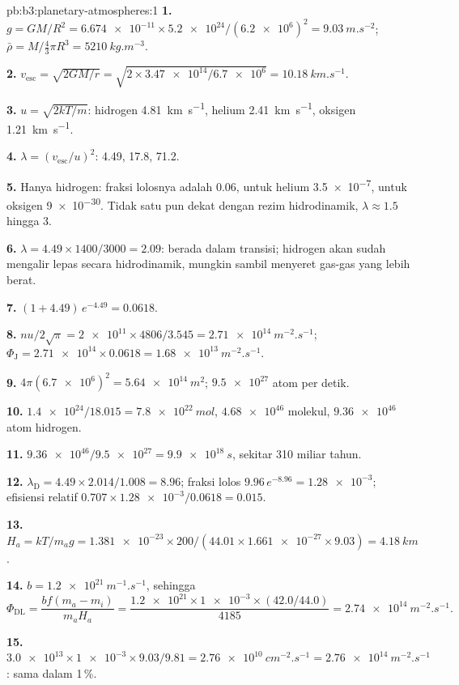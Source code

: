\begin{solution}{pb:b3:planetary-atmospheres:1}
\textbf{1.} $g = GM/R^2 = \num{6.674e-11}\times\num{5.2e24}/(\num{6.2e6})^2 =
\qty{9.03}{m.s^{-2}}$; $\bar\rho = M/\tfrac43\pi R^3 = \qty{5210}{kg.m^{-3}}$.

\textbf{2.} $v_\mathrm{esc} = \sqrt{2GM/r} = \sqrt{2\times\num{3.47e14}/\num{6.7e6}}
= \qty{10.18}{km.s^{-1}}$.

\textbf{3.} $u = \sqrt{2kT/m}$: hidrogen \qty{4.81}{km.s^{-1}}, helium
\qty{2.41}{km.s^{-1}}, oksigen \qty{1.21}{km.s^{-1}}.

\textbf{4.} $\lambda = (v_\mathrm{esc}/u)^2$: 4.49, 17.8, 71.2.

\textbf{5.} Hanya hidrogen: fraksi lolosnya adalah 0.06, untuk helium
\num{3.5e-7}, untuk oksigen \num{9e-30}. Tidak satu pun dekat dengan rezim
hidrodinamik, $\lambda \approx 1.5$ hingga 3.

\textbf{6.} $\lambda = 4.49\times1400/3000 = 2.09$: berada dalam transisi;
hidrogen akan sudah mengalir lepas secara hidrodinamik, mungkin sambil menyeret
gas-gas yang lebih berat.

\textbf{7.} $(1 + 4.49)\,e^{-4.49} = 0.0618$.

\textbf{8.} $n u/2\sqrt\pi = \num{2e11}\times4806/3.545 = \qty{2.71e14}{m^{-2}.s^{-1}}$;
$\Phi_\mathrm J = \num{2.71e14}\times0.0618 = \qty{1.68e13}{m^{-2}.s^{-1}}$.

\textbf{9.} $4\pi(\num{6.7e6})^2 = \qty{5.64e14}{m^2}$; $\num{9.5e27}$ atom per
detik.

\textbf{10.} $\num{1.4e24}/18.015 = \qty{7.8e22}{mol}$, $\num{4.68e46}$ molekul,
$\num{9.36e46}$ atom hidrogen.

\textbf{11.} $\num{9.36e46}/\num{9.5e27} = \qty{9.9e18}{s}$, sekitar 310 miliar
tahun.

\textbf{12.} $\lambda_\mathrm D = 4.49\times2.014/1.008 = 8.96$; fraksi lolos
$9.96\,e^{-8.96} = \num{1.28e-3}$; efisiensi relatif $0.707\times
\num{1.28e-3}/0.0618 = 0.015$.

\textbf{13.} $H_a = kT/m_a g = \num{1.381e-23}\times200/(44.01\times\num{1.661e-27}
\times9.03) = \qty{4.18}{km}$.

\textbf{14.} $b = \qty{1.2e21}{m^{-1}.s^{-1}}$, sehingga
\[
\Phi_\mathrm{DL} = \frac{b f(m_a - m_i)}{m_a H_a}
= \frac{\num{1.2e21}\times\num{1e-3}\times(42.0/44.0)}{4185}
= \qty{2.74e14}{m^{-2}.s^{-1}}.
\]

\textbf{15.} $\num{3.0e13}\times\num{1e-3}\times9.03/9.81 =
\qty{2.76e10}{cm^{-2}.s^{-1}} = \qty{2.76e14}{m^{-2}.s^{-1}}$: sama
dalam 1\,\%.


\end{solution}
